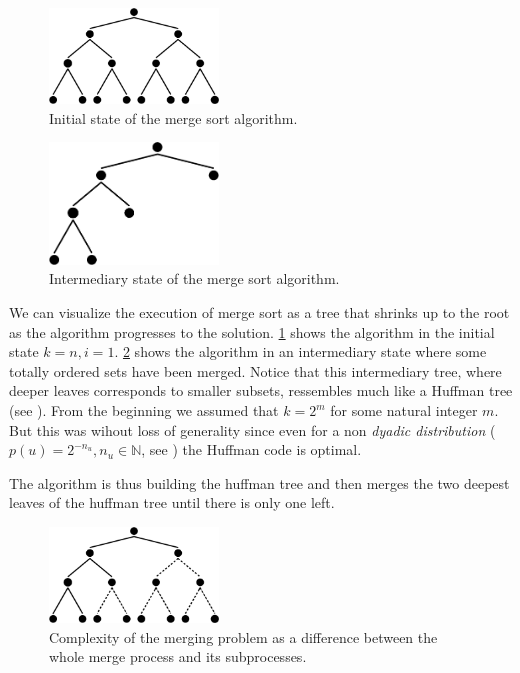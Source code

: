 \begin{figure}
	\centering
	\includegraphics[width=0.4\textwidth]{fig/merging/huffman-1-trim}
	\caption{Initial state of the merge sort algorithm.}
	\label{tree:merging:fig/huffman-1}
\end{figure}

\begin{figure}
	\centering
	\includegraphics[width=0.4\textwidth, bb= 0mm 0mm 131mm 74mm]{fig/merging/huffman-3-trim}
	\caption{Intermediary state of the merge sort algorithm.}
	\label{tree:merging:fig/huffman-3}
\end{figure}

We can visualize the execution of merge sort as a tree that shrinks up to the root as the algorithm progresses to the solution. \ref{tree:merging:fig/huffman-1} shows the algorithm in the initial state $k = n, i = 1$. \ref{tree:merging:fig/huffman-3} shows the algorithm in an intermediary state where some totally ordered sets have been merged. Notice that this intermediary tree, where deeper leaves corresponds to smaller subsets, ressembles much like a Huffman tree (see \cite{huffman1952method}). From the beginning we assumed that $k = 2^m$ for some natural integer $m$. But this was wihout loss of generality since even for a non \emph{dyadic distribution} ($p(u) = 2^{-n_u}, n_u \in \mathbb{N}$, see \cite{cover2012elements}) the Huffman code is optimal.

The algorithm is thus building the huffman tree and then merges the two deepest leaves of the huffman tree until there is only one left.

\begin{figure}
	\centering
	\includegraphics[width=0.4\textwidth]{fig/merging/huffman-2-trim}
	\caption{Complexity of the merging problem as a difference between the whole merge process and its subprocesses.}
	\label{tree:merging:fig/huffman-2}
\end{figure}

